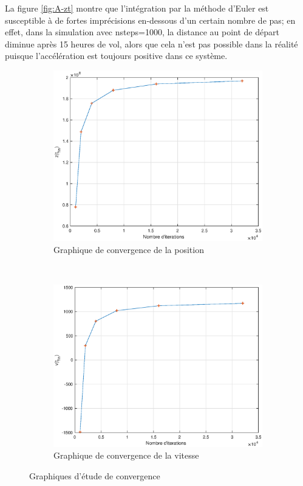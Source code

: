 \documentclass[a4paper,12pt,twoside]{article}
\begin{document}
La figure \ref{fig:A-zt} montre que l'intégration par la méthode d'Euler est susceptible à de fortes imprécisions en-dessous d'un certain nombre de pas; en effet, dans la simulation avec nsteps=1000, la distance au point de départ diminue après 15 heures de vol, alors que cela n'est pas possible dans la réalité puisque l'accélération est toujours positive dans ce système.\\

\begin{figure}[h]
	\centering
	\begin{subfigure}[b]{0.45\textwidth}
		\includegraphics[width=\textwidth]{graphs/zConvA.eps}
		\caption{Graphique de convergence de la position}
		\label{fig:A-zConv}
	\end{subfigure}
	~
	\begin{subfigure}[b]{0.45\textwidth}
		\includegraphics[width=\textwidth]{graphs/vConvA.eps}
		\caption{Graphique de convergence de la vitesse}
		\label{fig:A-vConv}
	\end{subfigure}
	\caption{Graphiques d'étude de convergence}
	\label{fig:A-conv}
\end{figure}
\end{document}

